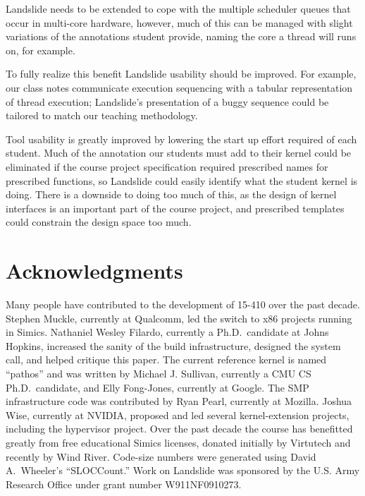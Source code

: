 
Landslide needs to be extended to cope with the multiple scheduler queues that occur in multi-core hardware, however, much of this can be managed with slight variations of the annotations student provide, naming the core a thread will runs on, for example.

To fully realize this benefit Landslide usability should be improved.
For example, our class notes communicate execution sequencing with a tabular representation of thread execution; Landslide's presentation of a buggy sequence could be tailored to match our teaching methodology.

Tool usability is greatly improved by lowering the start up effort required of each student.
Much of the annotation our students must add to their kernel could be eliminated if the course project specification required prescribed names for prescribed functions, so Landslide could easily identify what the student kernel is doing.
There is a downside to doing too much of this, as the design of kernel interfaces is an important part of the course project, and prescribed templates could constrain the design space too much.





\section*{Acknowledgments}

Many people have contributed to the development of
15-410 over the past decade.
Stephen Muckle, currently at Qualcomm, led
the switch to x86 projects running in Simics.
Nathaniel Wesley Filardo,
currently a Ph.D.\ candidate at Johns Hopkins,
increased the sanity of the build infrastructure,
designed the  system call, and helped critique this paper.
The current reference kernel is named ``pathos''
and was written by Michael J. Sullivan,
currently a CMU CS Ph.D.\ candidate,
and Elly Fong-Jones, currently at Google.
The SMP infrastructure code was contributed by
Ryan Pearl, currently at Mozilla.
Joshua Wise, currently at NVIDIA,
proposed and led several kernel-extension projects,
including the hypervisor project.
Over the past decade the course has benefitted
greatly from free educational Simics licenses,
donated initially by Virtutech and recently by
Wind River.
Code-size numbers were generated using David A.\ Wheeler's
``SLOCCount.''
Work on Landslide was sponsored by the U.S. Army Research Office under grant number W911NF0910273.

